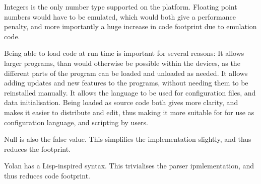 \documentclass[11pt]{report}
\begin{document}
Integers is the only number type supported on the platform. Floating point numbers would have to be emulated, which would both give a performance penalty, and more importantly a huge increase in code footprint due to emulation code.

Being able to load code at run time is important for several reasons:
It allows larger programs, than would otherwise be possible within the devices, as the different parts of the program can be loaded and unloaded as needed.
It allows adding updates and new features to the programs, without needing them to be reinstalled manually.
It allows the language to be used for configuration files, and data initialisation.
Being loaded as source code both gives more clarity, and makes it easier to distribute and edit, thus making it more suitable for for use as configuration language, and scripting by users.

Null is also the false value. This simplifies the implementation slightly, and thus reduces the footprint.

Yolan has a Lisp-inspired syntax. This trivialises the parser ipmlementation, and thus reduces code footprint.



\begin{comment}
\paragraph{Lisp-like syntax} A lisp-like syntax trivialises 

null-is-false
dynamic scope

... every expression yields a value, possibly false. Yes, you can bind a variable to the result of a false condition.

... lazy ffi.

\subsection{* Syntax}
A lisp-like syntax is choosen in order to simplify the parser and thereby reduce the code footprint.
Square brackets are used instead of parenthesis in order to indicate that the lists are not lisp-like cons-lists, but arrays. 

\section{* Implementation details}
\subsection{* AST rewriting}

\end{comment}
\end{document}
